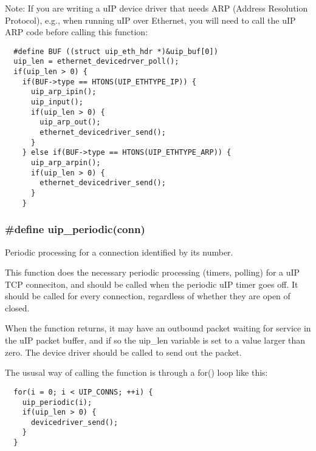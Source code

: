 \begin{Desc}
\item[Note:]If you are writing a u\-IP device driver that needs ARP (Address Resolution Protocol), e.g., when running u\-IP over Ethernet, you will need to call the u\-IP ARP code before calling this function: 

\footnotesize\begin{verbatim}  #define BUF ((struct uip_eth_hdr *)&uip_buf[0])
  uip_len = ethernet_devicedrver_poll();
  if(uip_len > 0) {
    if(BUF->type == HTONS(UIP_ETHTYPE_IP)) {
      uip_arp_ipin();
      uip_input();
      if(uip_len > 0) {
        uip_arp_out();
        ethernet_devicedriver_send();
      }
    } else if(BUF->type == HTONS(UIP_ETHTYPE_ARP)) {
      uip_arp_arpin();
      if(uip_len > 0) {
        ethernet_devicedriver_send();
      }
    }
\end{verbatim}
\normalsize
 \end{Desc}
\hypertarget{a00063_g1024f8a5fa65e82bf848b2e6590d9628}{
\subsubsection[uip\_\-periodic]{\setlength{\rightskip}{0pt plus 5cm}\#define uip\_\-periodic(conn)}}
\label{a00063_g1024f8a5fa65e82bf848b2e6590d9628}


Periodic processing for a connection identified by its number. 

This function does the necessary periodic processing (timers, polling) for a u\-IP TCP conneciton, and should be called when the periodic u\-IP timer goes off. It should be called for every connection, regardless of whether they are open of closed.

When the function returns, it may have an outbound packet waiting for service in the u\-IP packet buffer, and if so the uip\_\-len variable is set to a value larger than zero. The device driver should be called to send out the packet.

The ususal way of calling the function is through a for() loop like this: 

\footnotesize\begin{verbatim}  for(i = 0; i < UIP_CONNS; ++i) {
    uip_periodic(i);
    if(uip_len > 0) {
      devicedriver_send();
    }
  }
\end{verbatim}
\normalsize



